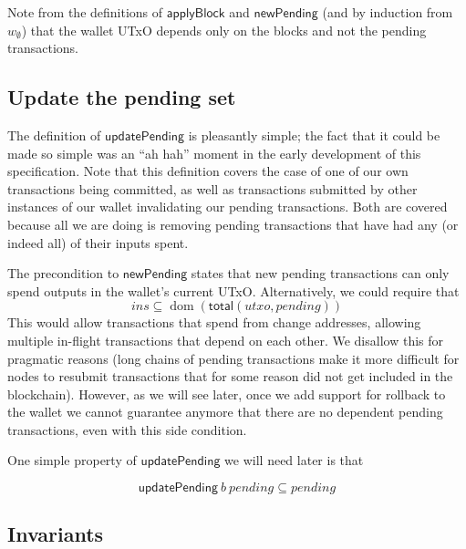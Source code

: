 \documentclass{article}
\DeclareMathOperator{\dom}{dom}
\theoremstyle{definition}{
  \newtheorem{lemma}{Lemma}[section] %
  \newtheorem{definition}[lemma]{Definition}
}
\theoremstyle{theorem}{
  \newtheorem{invariant}[lemma]{Invariant}
  \newtheorem{proofobligation}[lemma]{Proof Obligation}
}
\numberwithin{equation}{lemma}
\begin{document}
Note from the definitions of $\mathsf{applyBlock}$ and $\mathsf{newPending}$
(and by induction from $w_\emptyset$) that the wallet UTxO depends only on the
blocks and not the pending transactions.

\subsection{Update the pending set}
\label{sec:updatePending}

The definition of $\mathsf{updatePending}$ is pleasantly simple; the fact that
it could be made so simple was an ``ah hah'' moment in the early development of
this specification. Note that this definition covers the case of one of our own
transactions being committed, as well as transactions submitted by other
instances of our wallet invalidating our pending transactions. Both are covered
because all we are doing is removing pending transactions that have had any (or
indeed all) of their inputs spent.

The precondition to $\mathsf{newPending}$ states that new pending transactions
can only spend outputs in the wallet's current UTxO. Alternatively, we could
require that
%
\begin{equation*}
\mathit{ins} \subseteq \dom (\mathsf{total}(\mathit{utxo}, \mathit{pending}))
\end{equation*}
%
This would allow transactions that spend from change addresses, allowing
multiple in-flight transactions that depend on each other. We disallow this
for pragmatic reasons (long chains of pending transactions make it more
difficult for nodes to resubmit transactions that for some reason did not
get included in the blockchain). However, as we will see later, once
we add support for rollback to the wallet we cannot guarantee anymore that
there are no dependent pending transactions, even with this side condition.

One simple property of $\mathsf{updatePending}$ we will need later is that
%
\begin{lemma} \label{lem:updatePending_is_filter}
\begin{equation*}
\mathsf{updatePending} ~ b ~ \mathit{pending} \subseteq \mathit{pending}
\end{equation*}
\end{lemma}

\subsection{Invariants}
\label{sec:invariants}
\end{document}
